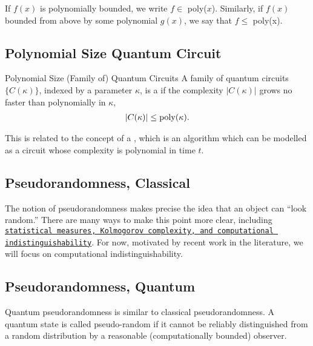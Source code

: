If \(f(x)\) is polynomially bounded, we write \(f \in \) poly(\(x\)).
Similarly, if \(f(x)\) bounded from above by some polynomial \(g(x)\), we say that \(f \leq\) poly(x).

\subsection{Polynomial Size Quantum Circuit}
\begin{definition}{Polynomial Size (Family of) Quantum Circuits}{}
	A family of quantum circuits \(\{C(\kappa)\}\), indexed by a parameter \(\kappa\), is a   if the complexity \(|C(\kappa)|\) grows no faster than polynomially in \(\kappa\),
	\begin{align}
		|C(\kappa)| \leq {\rm poly}(\kappa)
		.
	\end{align}
\end{definition}

This is related to the concept of a , which is an algorithm which can be modelled as a circuit whose complexity is polynomial in time \(t\). 

\subsection{Pseudorandomness, Classical}
The notion of pseudorandomness makes precise the idea that an object can ``look random.''
%
There are many ways to make this point more clear, including \href{https://people.seas.harvard.edu/~salil/pseudorandomness/pseudorandomness-Aug12.pdf#page=147&zoom=100,0,800}{\texttt{statistical measures, Kolmogorov complexity, and computational indistinguishability}}.
%
For now, motivated by recent work in the literature, we will focus on computational indistinguishability.


\subsection{Pseudorandomness, Quantum}
Quantum pseudorandomness is similar to classical pseudorandomness.
%
A quantum state is called pseudo-random if it cannot be reliably distinguished from a random distribution by a reasonable (computationally bounded) observer.

